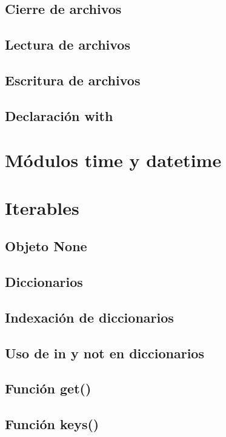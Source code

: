 \documentclass{report}
\begin{document}
\section{Cierre de archivos}

\section{Lectura de archivos}

\section{Escritura de archivos}

\section{Declaración with}

\clearpage\chapter{Módulos time y datetime}

\clearpage\chapter{Iterables}

\section{Objeto None}

\section{Diccionarios}

\section{Indexación de diccionarios}

\section{Uso de in y not en diccionarios}

\section{Función get()}

\section{Función keys()}
\end{document}
